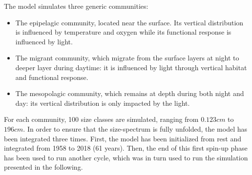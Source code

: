 %
%

The model simulates three generic communities:
\begin{itemize}
\item{The epipelagic community, located near the surface. Its vertical distribution is influenced by temperature and oxygen while its functional response is influenced by light.}
\item{The migrant community, which migrate from the surface layers at night to deeper layer during daytime: it is influenced by light through vertical habitat and functional response.}
\item{The  mesopolagic community, which remains at depth during both night and day: its vertical distribution is only impacted by the light.}
\end{itemize}

For each community, 100 size classes are simulated, ranging from $0.123cm$ to $196cm$. In order to ensure that the size-spectrum is fully unfolded, the model has been integrated three times. First, the model has been initialized from rest and integrated from 1958 to 2018 (61 years). Then, the end of this first spin-up phase has been used to run another cycle, which was in turn used to run the simulation presented in the following.


